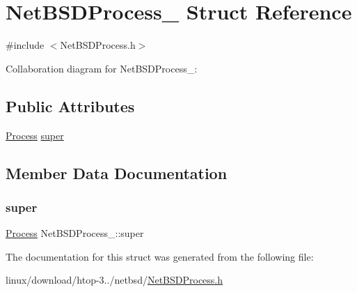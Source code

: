 \hypertarget{structNetBSDProcess__}{}\section{Net\+B\+S\+D\+Process\+\_\+ Struct Reference}
\label{structNetBSDProcess__}


{\ttfamily \#include $<$Net\+B\+S\+D\+Process.\+h$>$}



Collaboration diagram for Net\+B\+S\+D\+Process\+\_\+\+:
\subsection*{Public Attributes}
\begin{DoxyCompactItemize}
\item 
\hyperlink{Process_8h_a20673e8fa40981a168bf0e196c4cef3b}{Process} \hyperlink{structNetBSDProcess___a28117fa70c94568608f63e77fb7f186e}{super}
\end{DoxyCompactItemize}


\subsection{Member Data Documentation}
\mbox{\label{structNetBSDProcess___a28117fa70c94568608f63e77fb7f186e}} 
\subsubsection{\texorpdfstring{super}{super}}
{\footnotesize\ttfamily \hyperlink{Process_8h_a20673e8fa40981a168bf0e196c4cef3b}{Process} Net\+B\+S\+D\+Process\+\_\+\+::super}



The documentation for this struct was generated from the following file\+:\begin{DoxyCompactItemize}
\item 
linux/download/htop-\/3../netbsd/\hyperlink{NetBSDProcess_8h}{Net\+B\+S\+D\+Process.\+h}\end{DoxyCompactItemize}
